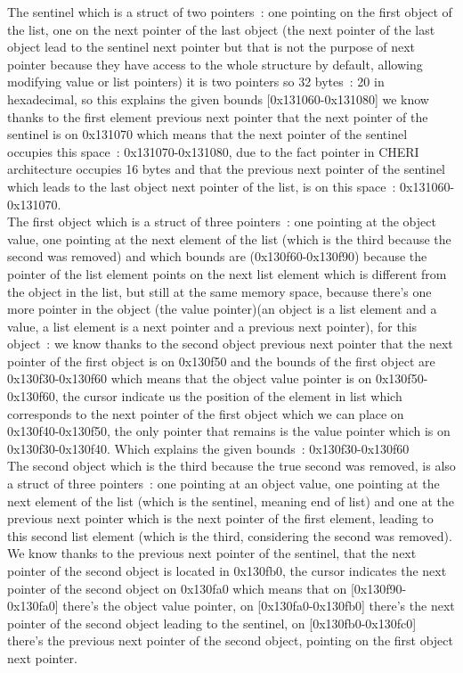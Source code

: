 \documentclass[a4paper, 11pt]{article}
\begin{document}
The sentinel which is a struct of two pointers : one pointing on the first object of the list, one on the next pointer of the last object (the next pointer of the last object lead to the sentinel next pointer but that is not the purpose of next pointer because they have access to the whole structure by default, allowing modifying value or list pointers) it is two pointers so 32 bytes : 20 in hexadecimal, so this explains the given bounds [0x131060-0x131080] we know thanks to the first element previous next pointer that the next pointer of the sentinel is on 0x131070 which means that the next pointer of the sentinel occupies this space : 0x131070-0x131080, due to the fact pointer in CHERI architecture occupies 16 bytes and that the previous next pointer of the sentinel which leads to the last object next pointer of the list, is on this space : 0x131060-0x131070.\\
The first object which is a struct of three pointers : one pointing at the object value, one pointing at the next element of the list (which is the third because the second was removed) and which bounds are (0x130f60-0x130f90) because the pointer of the list element points on the next list element which is different from the object in the list, but still at the same memory space, because there’s one more pointer in the object (the value pointer)(an object is a list element and a value, a list element is a next pointer and a previous next pointer), for this object : we know thanks to the second object previous next pointer that the next pointer of the first object is on 0x130f50 and the bounds of the first object are 0x130f30-0x130f60 which means that the object value pointer is on 0x130f50-0x130f60, the cursor indicate us the position of the element in list which corresponds to the next pointer of the first object which we can place on 0x130f40-0x130f50, the only pointer that remains is the value pointer which is on 0x130f30-0x130f40. Which explains the given bounds : 0x130f30-0x130f60\\
The second object which is the third because the true second was removed, is also a struct of three pointers : one pointing at an object value, one pointing at the next element of the list (which is the sentinel, meaning end of list) and one at the previous next pointer which is the next pointer of the first element, leading to this second list element (which is the third, considering the second was removed). We know thanks to the previous next pointer of the sentinel, that the next pointer of the second object is located in 0x130fb0, the cursor indicates the next pointer of the second object on 0x130fa0 which means that on [0x130f90-0x130fa0] there’s the object value pointer, on [0x130fa0-0x130fb0] there’s the next pointer of the second object leading to the sentinel, on [0x130fb0-0x130fc0] there’s the previous next pointer of the second object, pointing on the first object next pointer.\\
\end{document}
